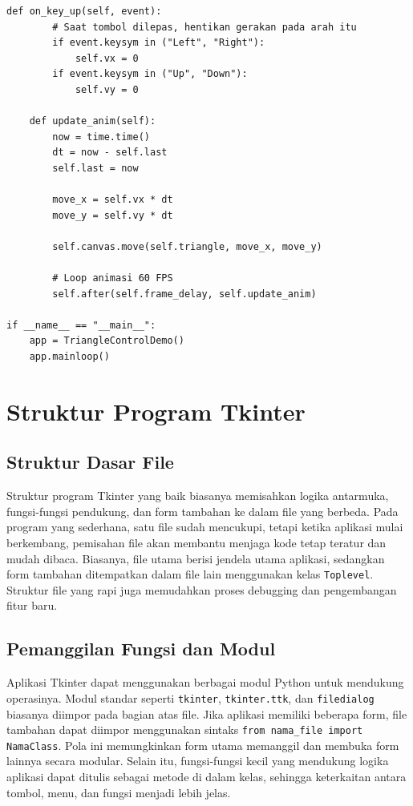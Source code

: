 \begin{lstlisting}[style=PythonStyle, caption={Mengendalikan segitiga dengan papan ketik}, label={lst:b12-mengendalikan-segitiga-dengan-papan-ketik}]
    def on_key_up(self, event):
        # Saat tombol dilepas, hentikan gerakan pada arah itu
        if event.keysym in ("Left", "Right"):
            self.vx = 0
        if event.keysym in ("Up", "Down"):
            self.vy = 0

    def update_anim(self):
        now = time.time()
        dt = now - self.last
        self.last = now

        move_x = self.vx * dt
        move_y = self.vy * dt

        self.canvas.move(self.triangle, move_x, move_y)

        # Loop animasi 60 FPS
        self.after(self.frame_delay, self.update_anim)

if __name__ == "__main__":
    app = TriangleControlDemo()
    app.mainloop()
\end{lstlisting}


\section{Struktur Program Tkinter}

\subsection{Struktur Dasar File}
Struktur program Tkinter yang baik biasanya memisahkan logika antarmuka, fungsi-fungsi pendukung, dan form tambahan ke dalam file yang berbeda. Pada program yang sederhana, satu file sudah mencukupi, tetapi ketika aplikasi mulai berkembang, pemisahan file akan membantu menjaga kode tetap teratur dan mudah dibaca. Biasanya, file utama berisi jendela utama aplikasi, sedangkan form tambahan ditempatkan dalam file lain menggunakan kelas \texttt{Toplevel}. Struktur file yang rapi juga memudahkan proses debugging dan pengembangan fitur baru.

\subsection{Pemanggilan Fungsi dan Modul}
Aplikasi Tkinter dapat menggunakan berbagai modul Python untuk mendukung operasinya. Modul standar seperti \texttt{tkinter}, \texttt{tkinter.ttk}, dan \texttt{filedialog} biasanya diimpor pada bagian atas file. Jika aplikasi memiliki beberapa form, file tambahan dapat diimpor menggunakan sintaks \texttt{from nama\_file import NamaClass}. Pola ini memungkinkan form utama memanggil dan membuka form lainnya secara modular. Selain itu, fungsi-fungsi kecil yang mendukung logika aplikasi dapat ditulis sebagai metode di dalam kelas, sehingga keterkaitan antara tombol, menu, dan fungsi menjadi lebih jelas.

